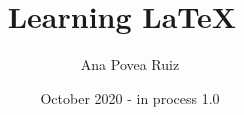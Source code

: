 \documentclass[a4paper,12pt]{article}
\title{Learning \LaTeX\ }
\author{Ana Povea Ruiz }%
\date{October 2020 - in process 1.0}
\begin{document}
\newpage

\begin{titlepage}
\maketitle
\end{titlepage}

\newpage
\tableofcontents
\newpage





\end{document}
